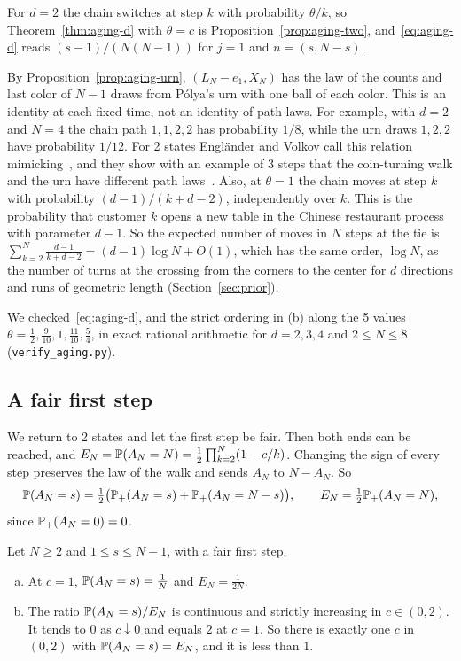 \begin{remark}\label{rem:aging-d}
For $d=2$ the chain switches at step $k$ with probability $\theta/k$, so
Theorem~\ref{thm:aging-d} with $\theta=c$ is
Proposition~\ref{prop:aging-two}, and~\eqref{eq:aging-d} reads
$(s-1)/(N(N-1))$ for $j=1$ and $n=(s,N-s)$.

By Proposition~\ref{prop:aging-urn}, $(L_N-e_1,X_N)$ has the law of
the counts and last color of $N-1$ draws from P\'olya's urn with one ball of
each color. This is an identity at each fixed time, not an identity of path
laws. For example, with $d=2$ and $N=4$ the chain path $1,1,2,2$ has
probability $1/8$, while the urn draws $1,2,2$ have probability $1/12$.
For 2 states Engl\"ander and Volkov call this relation
mimicking~, and they show with an
example of 3 steps that the coin-turning walk and the urn have different
path laws~. Also, at $\theta=1$ the chain moves at
step $k$ with probability $(d-1)/(k+d-2)$, independently over $k$. This is
the probability that customer $k$ opens a new table in the Chinese restaurant
process with parameter $d-1$. So the expected number of moves in $N$ steps at
the tie is $\sum_{k=2}^N\frac{d-1}{k+d-2}=(d-1)\log N+O(1)$, which has the
same order, $\log N$, as the number of turns at the crossing from the corners
to the center for $d$ directions and runs of geometric length
(Section~\ref{sec:prior}).

We checked~\eqref{eq:aging-d}, and the strict ordering in (b) along the 5
values $\theta=\frac12,\frac9{10},1,\frac{11}{10},\frac54$, in exact
rational arithmetic for $d=2,3,4$ and $2\le N\le8$
(\texttt{verify\_aging.py}).
\end{remark}

\subsection{A fair first step}

We return to 2 states and let the first step be fair. Then both ends can be
reached, and $E_N=\mathbb{P}(A_N=N)=\frac12\prod_{k=2}^N(1-c/k)$. Changing the sign
of every step preserves the law of the walk and sends $A_N$ to $N-A_N$. So
\begin{equation}\label{eq:aging-fair}
 \mathbb{P}(A_N=s)=\tfrac12\bigl(\mathbb{P}_+(A_N=s)+\mathbb{P}_+(A_N=N-s)\bigr),\qquad
 E_N=\tfrac12\mathbb{P}_+(A_N=N),
\end{equation}
since $\mathbb{P}_+(A_N=0)=0$.

\begin{proposition}\label{prop:aging-fair}
Let $N\ge2$ and $1\le s\le N-1$, with a fair first step.
\begin{enumerate}[(a)]
\item At $c=1$, $\mathbb{P}(A_N=s)=\frac1N$ and $E_N=\frac1{2N}$.
\item The ratio $\mathbb{P}(A_N=s)/E_N$ is continuous and strictly increasing in
$c\in(0,2)$. It tends to $0$ as $c\downarrow0$ and equals $2$ at $c=1$. So
there is exactly one $c$ in $(0,2)$ with $\mathbb{P}(A_N=s)=E_N$, and it is less
than $1$.
\end{enumerate}
\end{proposition}


